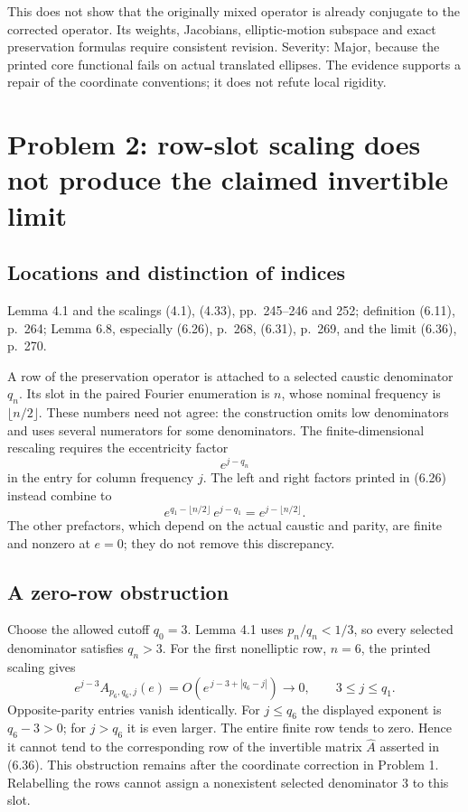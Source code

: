 \documentclass[10pt]{article}
\begin{document}
This does not show that the originally mixed operator is already conjugate to the corrected operator. Its weights, Jacobians, elliptic-motion subspace and exact preservation formulas require consistent revision. Severity: Major, because the printed core functional fails on actual translated ellipses. The evidence supports a repair of the coordinate conventions; it does not refute local rigidity.\par
\section*{Problem 2: row-slot scaling does not produce the claimed invertible limit}
\subsection*{Locations and distinction of indices}
Lemma 4.1 and the scalings (4.1), (4.33), pp. 245–246 and 252; definition (6.11), p. 264; Lemma 6.8, especially (6.26), p. 268, (6.31), p. 269, and the limit (6.36), p. 270.\par
A row of the preservation operator is attached to a selected caustic denominator \(q_n\). Its slot in the paired Fourier enumeration is \(n\), whose nominal frequency is \(\lfloor n/2\rfloor\). These numbers need not agree: the construction omits low denominators and uses several numerators for some denominators. The finite-dimensional rescaling requires the eccentricity factor \[e^{j-q_n}\] in the entry for column frequency \(j\). The left and right factors printed in (6.26) instead combine to \[e^{q_1-\lfloor n/2\rfloor}\,e^{j-q_1}
 =e^{j-\lfloor n/2\rfloor}.\] The other prefactors, which depend on the actual caustic and parity, are finite and nonzero at \(e=0\); they do not remove this discrepancy.\par
\subsection*{A zero-row obstruction}
Choose the allowed cutoff \(q_0=3\). Lemma 4.1 uses \(p_n/q_n<1/3\), so every selected denominator satisfies \(q_n>3\). For the first nonelliptic row, \(n=6\), the printed scaling gives \[e^{j-3} A_{p_6,q_6,j}(e)
 =O\!\left(e^{\,j-3+|q_6-j|}\right)
 \longrightarrow0,\qquad 3\leq j\leq q_1 .\] Opposite-parity entries vanish identically. For \(j\leq q_6\) the displayed exponent is \(q_6-3>0\); for \(j>q_6\) it is even larger. The entire finite row tends to zero. Hence it cannot tend to the corresponding row of the invertible matrix \(\widehat A\) asserted in (6.36). This obstruction remains after the coordinate correction in Problem 1. Relabelling the rows cannot assign a nonexistent selected denominator \(3\) to this slot.\par
\end{document}
